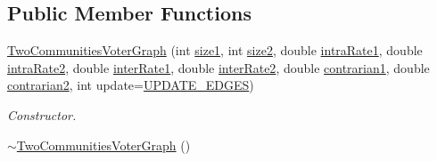 \subsection*{Public Member Functions}
\begin{DoxyCompactItemize}
\item 
\hyperlink{classTwoCommunitiesVoterGraph_a63c60c10b48a21413f7f60033448024e}{Two\-Communities\-Voter\-Graph} (int \hyperlink{classTwoCommunitiesVoterGraph_a3c9db0ac7e58d875ab3ce277bf74b284}{size1}, int \hyperlink{classTwoCommunitiesVoterGraph_a8b88457f020773b984e0d8c85d9ee502}{size2}, double \hyperlink{classTwoCommunitiesVoterGraph_a96a32ba7529177a7f6b73e827a57791e}{intra\-Rate1}, double \hyperlink{classTwoCommunitiesVoterGraph_a6e7ea06e014d75b7bf18441885e07e1e}{intra\-Rate2}, double \hyperlink{classTwoCommunitiesVoterGraph_af08c3b9a6e6f1dc8659a38ecd2d1afde}{inter\-Rate1}, double \hyperlink{classTwoCommunitiesVoterGraph_afab8bb5994f7fd1370d7d81caf7277d4}{inter\-Rate2}, double \hyperlink{classTwoCommunitiesVoterGraph_a883bf57bf07fb2e59f05df65df859a46}{contrarian1}, double \hyperlink{classTwoCommunitiesVoterGraph_a4274a05f5e2ceae57de1f0e71493b9a4}{contrarian2}, int update=\hyperlink{voter__graph_8hpp_ab3bec55c359e4ed771339c8bc61fc35aa01d100088352e1a7d3a34c9a66d0f951}{U\-P\-D\-A\-T\-E\-\_\-\-E\-D\-G\-E\-S})
\begin{DoxyCompactList}\small\item\em Constructor. \end{DoxyCompactList}\item 
\hypertarget{classTwoCommunitiesVoterGraph_ab74e186e76188e7de8ae11359ad1e55e}{\hyperlink{classTwoCommunitiesVoterGraph_ab74e186e76188e7de8ae11359ad1e55e}{$\sim$\-Two\-Communities\-Voter\-Graph} ()}\label{classTwoCommunitiesVoterGraph_ab74e186e76188e7de8ae11359ad1e55e}


\end{DoxyCompactItemize}
